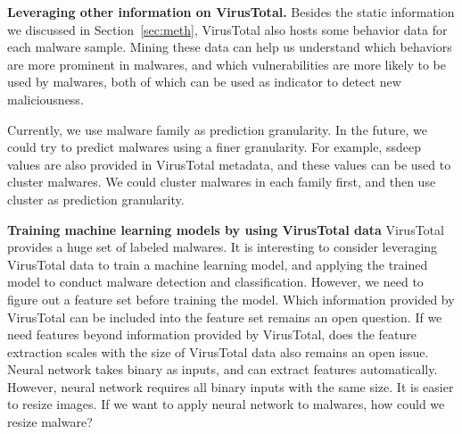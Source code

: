 {\bf Leveraging other information on VirusTotal.}
Besides the static information we discussed in Section~\ref{sec:meth}, 
VirusTotal also hosts some behavior data for each malware sample. 
Mining these data can help us understand which behaviors are more prominent in malwares, 
and which vulnerabilities are more likely to be used by malwares, both of which can be used as indicator to detect new maliciousness. 

Currently, we use malware family as prediction granularity. 
In the future, we could try to predict malwares using a finer granularity. 
For example, ssdeep values are also provided in VirusTotal metadata, 
and these values can be used to cluster malwares. 
We could cluster malwares in each family first, and then use cluster as prediction granularity. 

{\bf Training machine learning models by using VirusTotal data}
VirusTotal provides a huge set of labeled malwares. 
It is interesting to consider leveraging VirusTotal data to train a machine learning model, and applying the trained model to conduct malware detection and classification. 
However, we need to figure out a feature set before training the model. 
Which information provided by VirusTotal can be included into the feature set remains an open question. If we need features beyond information provided by VirusTotal, does the feature extraction scales with the size of VirusTotal data also remains an open issue. 
Neural network takes binary as inputs, and can extract features automatically. 
However, neural network requires all binary inputs with the same size. It is easier to resize images. If we want to apply neural network to malwares, how could we resize malware? 
